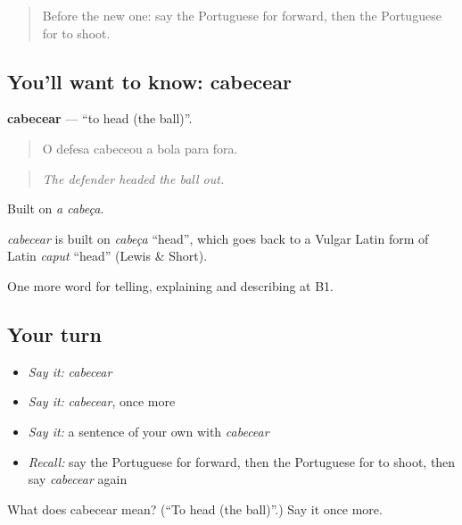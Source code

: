 \label{lesson:PT-C509-cabecear}



\begin{quote}
Before the new one: say the Portuguese for forward, then the Portuguese for to shoot.
\end{quote}

\subsection*{You'll want to know: cabecear}
\textbf{cabecear} — \textquotedblleft{}to head (the ball)\textquotedblright{}.

\begin{quote}
O defesa cabeceou a bola para fora.
\end{quote}

\begin{quote}
\emph{The defender headed the ball out.}
\end{quote}

Built on \emph{a cabeça}.

\begin{cousinweb}
\emph{cabecear} is built on \emph{cabeça} \textquotedblleft{}head\textquotedblright{}, which goes back to a Vulgar Latin form of Latin \emph{caput} \textquotedblleft{}head\textquotedblright{} (Lewis \& Short).
\end{cousinweb}

\begin{grammarlens}[title={What you've built}]
One more word for telling, explaining and describing at B1.
\end{grammarlens}

\subsection*{Your turn}
\begin{itemize}
\raggedright
  \item \emph{Say it:} \emph{cabecear}
  \item \emph{Say it:} \emph{cabecear}, once more
  \item \emph{Say it:} a sentence of your own with \emph{cabecear}
  \item \emph{Recall:} say the Portuguese for forward, then the Portuguese for to shoot, then say \emph{cabecear} again
\end{itemize}

\begin{tcolorbox}[breakable,colback=teal!4,colframe=teal!35!black,title={Before you move on}]
What does cabecear mean? (\textquotedblleft{}To head (the ball)\textquotedblright{}.) Say it once more.
\end{tcolorbox}
